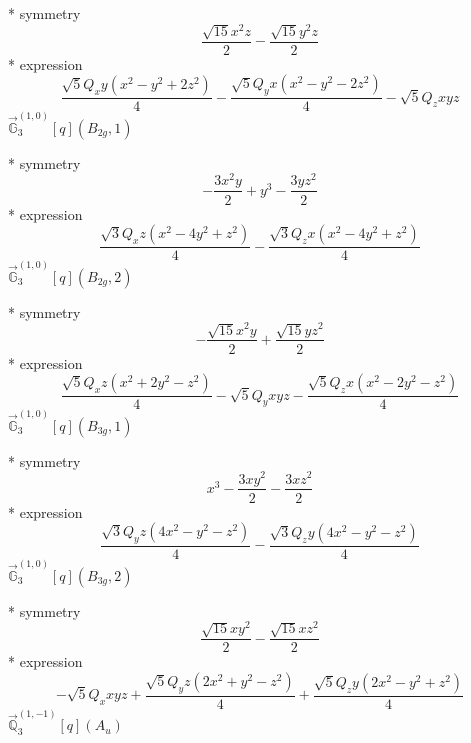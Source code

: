 \documentclass[fleqn,8pt]{jsarticle}
\begin{document}
\noindent\quad ** symmetry
\begin{dmath*}
\frac{\sqrt{15} x^{2} z}{2} - \frac{\sqrt{15} y^{2} z}{2}
\end{dmath*}
\noindent\quad ** expression
\begin{dmath*}
\frac{\sqrt{5} Q_{x} y \left(x^{2} - y^{2} + 2 z^{2}\right)}{4} - \frac{\sqrt{5} Q_{y} x \left(x^{2} - y^{2} - 2 z^{2}\right)}{4} - \sqrt{5} Q_{z} x y z
\end{dmath*}
\noindent\quad $\vec{\mathbb{G}}_{3}^{(1,0)}[q](B_{2g},1)$

\noindent\quad ** symmetry
\begin{dmath*}
- \frac{3 x^{2} y}{2} + y^{3} - \frac{3 y z^{2}}{2}
\end{dmath*}
\noindent\quad ** expression
\begin{dmath*}
\frac{\sqrt{3} Q_{x} z \left(x^{2} - 4 y^{2} + z^{2}\right)}{4} - \frac{\sqrt{3} Q_{z} x \left(x^{2} - 4 y^{2} + z^{2}\right)}{4}
\end{dmath*}
\noindent\quad $\vec{\mathbb{G}}_{3}^{(1,0)}[q](B_{2g},2)$

\noindent\quad ** symmetry
\begin{dmath*}
- \frac{\sqrt{15} x^{2} y}{2} + \frac{\sqrt{15} y z^{2}}{2}
\end{dmath*}
\noindent\quad ** expression
\begin{dmath*}
\frac{\sqrt{5} Q_{x} z \left(x^{2} + 2 y^{2} - z^{2}\right)}{4} - \sqrt{5} Q_{y} x y z - \frac{\sqrt{5} Q_{z} x \left(x^{2} - 2 y^{2} - z^{2}\right)}{4}
\end{dmath*}
\noindent\quad $\vec{\mathbb{G}}_{3}^{(1,0)}[q](B_{3g},1)$

\noindent\quad ** symmetry
\begin{dmath*}
x^{3} - \frac{3 x y^{2}}{2} - \frac{3 x z^{2}}{2}
\end{dmath*}
\noindent\quad ** expression
\begin{dmath*}
\frac{\sqrt{3} Q_{y} z \left(4 x^{2} - y^{2} - z^{2}\right)}{4} - \frac{\sqrt{3} Q_{z} y \left(4 x^{2} - y^{2} - z^{2}\right)}{4}
\end{dmath*}
\noindent\quad $\vec{\mathbb{G}}_{3}^{(1,0)}[q](B_{3g},2)$

\noindent\quad ** symmetry
\begin{dmath*}
\frac{\sqrt{15} x y^{2}}{2} - \frac{\sqrt{15} x z^{2}}{2}
\end{dmath*}
\noindent\quad ** expression
\begin{dmath*}
- \sqrt{5} Q_{x} x y z + \frac{\sqrt{5} Q_{y} z \left(2 x^{2} + y^{2} - z^{2}\right)}{4} + \frac{\sqrt{5} Q_{z} y \left(2 x^{2} - y^{2} + z^{2}\right)}{4}
\end{dmath*}
\noindent\quad $\vec{\mathbb{Q}}_{3}^{(1,-1)}[q](A_{u})$
\end{document}
